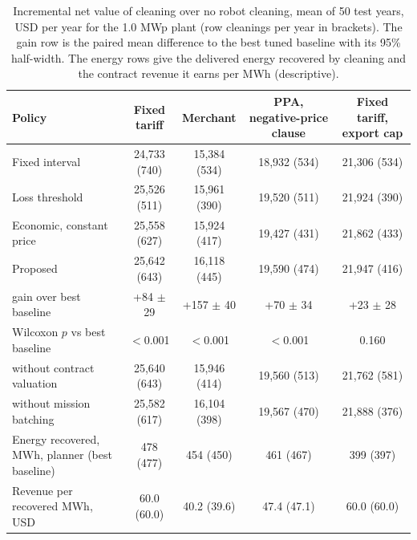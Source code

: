 \begin{table}[!t]
\centering
\caption{Incremental net value of cleaning over no robot cleaning, mean of 50 test years, USD per year for the 1.0 MWp plant (row cleanings per year in brackets). The gain row is the paired mean difference to the best tuned baseline with its 95\% half-width. The energy rows give the delivered energy recovered by cleaning and the contract revenue it earns per MWh (descriptive).}
\label{tab:rq1}
\begin{tabular}{lcccc}
\toprule
Policy & Fixed tariff & Merchant & PPA, negative-price clause & Fixed tariff, export cap \\
\midrule
Fixed interval & 24,733 (740) & 15,384 (534) & 18,932 (534) & 21,306 (534) \\
Loss threshold & 25,526 (511) & 15,961 (390) & 19,520 (511) & 21,924 (390) \\
Economic, constant price & 25,558 (627) & 15,924 (417) & 19,427 (431) & 21,862 (433) \\
Proposed & 25,642 (643) & 16,118 (445) & 19,590 (474) & 21,947 (416) \\
\quad gain over best baseline & +84 $\pm$ 29 & +157 $\pm$ 40 & +70 $\pm$ 34 & +23 $\pm$ 28 \\
\quad Wilcoxon $p$ vs best baseline & $<$0.001 & $<$0.001 & $<$0.001 & 0.160 \\
\quad without contract valuation & 25,640 (643) & 15,946 (414) & 19,560 (513) & 21,762 (581) \\
\quad without mission batching & 25,582 (617) & 16,104 (398) & 19,567 (470) & 21,888 (376) \\
\midrule
Energy recovered, MWh, planner (best baseline) & 478 (477) & 454 (450) & 461 (467) & 399 (397) \\
Revenue per recovered MWh, USD & 60.0 (60.0) & 40.2 (39.6) & 47.4 (47.1) & 60.0 (60.0) \\
\bottomrule
\end{tabular}
\end{table}

